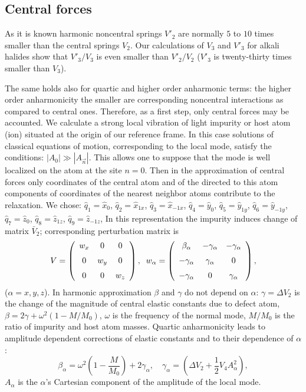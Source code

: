 \subsection{Central forces}
As it is known
harmonic noncentral springs $V'_2$ are normally $5$ to $10$ times smaller 
than the central springs $V_2$. Our calculations of $V_3$ and $V'_3$ for
alkali halides show that $V'_3/V_3$ is even smaller than $V'_2/V_2$
($V'_3$ is twenty-thirty times smaller than $V_3$).

The same holds also for
quartic and higher order anharmonic terms: the higher order anharmonicity the
smaller are corresponding noncentral interactions as compared to central ones.
Therefore, as a first step, only central forces may be accounted.
We calculate a strong local  vibration of light 
impurity or host atom (ion) situated at the origin of our reference frame. In
this case solutions of classical equations of motion, 
corresponding to the local mode, satisfy the conditions:
$|A_{0}| \gg |A_{\vec{n}}|$. This allows one to suppose that the mode is well 
localized on the atom at the site $n=0$. Then in the approximation of central 
forces only coordinates of the central atom and of the directed to 
this atom components of coordinates of the nearest neighbor atoms contribute 
to the relaxation. We chose:
$\hat{q}_1 = \hat{x}_0$,
$\hat{q}_2 = \hat{x}_{1x}$,
$\hat{q}_3 = \hat{x}_{-1x}$,
$\hat{q}_4 = \hat{y}_0$,
$\hat{q}_5 = \hat{y}_{1y}$,
$\hat{q}_6 = \hat{y}_{-1y}$,
$\hat{q}_7 = \hat{z}_0$,
$\hat{q}_8 = \hat{z}_{1z}$,
$\hat{q}_9 = \hat{z}_{-1z}$,
In this representation the impurity induces change of matrix 
$\bar{V}_2$; corresponding perturbation matrix is
\[ V = \left (\begin{array}{ccc}
w_x&0&0\\\noalign{\medskip}
0&w_y&0\\\noalign{\medskip}
0&0&w_z\end{array}
\right ) , \;\;
w_{\alpha} = \left (\begin{array}{ccc}
\beta_{\alpha}&-\gamma_{\alpha}&-\gamma_{\alpha}\\\noalign{\medskip}
-\gamma_{\alpha}&\gamma_{\alpha}&0\\\noalign{\medskip}
-\gamma_{\alpha}&0&\gamma_{\alpha}\end{array}
\right ) , \]
($\alpha = x,y,z$). In harmonic approximation $\beta$ and $\gamma$ do
not depend on $\alpha$: $\gamma = \Delta V_2$ is the change of the magnitude 
of central elastic constants due to defect atom, 
$\beta = 2\gamma+\omega^2 (1-M/M_0)$, $\omega$ is the frequency of
the normal mode, $M/M_0$ is the ratio of impurity and host atom masses.
Quartic anharmonicity leads to amplitude dependent corrections of
elastic constants and to their dependence of $\alpha$:
\begin{equation}
\beta_{\alpha} = \omega^2(1- \frac{M}{M_0})+2\gamma_{\alpha},\quad
\gamma_{\alpha} = (\Delta V_2+\frac{1}{2}V_4 A^2_{\alpha}),
\end{equation}
 $A_{\alpha}$ is the $\alpha$'s Cartesian 
component of the amplitude of the local mode.

